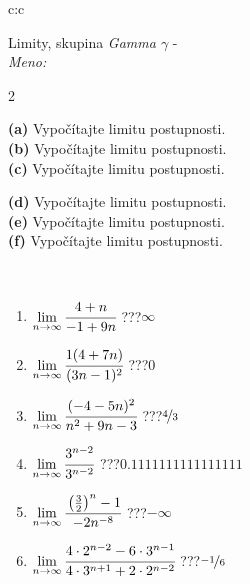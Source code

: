\documentclass[10pt]{report}
\begin{document}
\newpage
\thispagestyle{empty}
\begin{tabular}{c:c}
\begin{minipage}[c][104.5mm][t]{0.5\linewidth}
\begin{center}
\vspace{5mm}
{\huge Limity, skupina \textit{Gamma $\gamma$} -}\\[5mm]
\textit{Meno:}\phantom{xxxxxxxxxxxxxxxxxxxxxxxxxxxxxxxxxxxxxxxxxxxxxxxxxxxxxxxxxxxxxxxxx}\\[5mm]
\begin{minipage}{0.95\linewidth}
\begin{center}
{\small \begin{multicols}{2} \raggedright
\textbf{(a)} Vypočítajte limitu postupnosti. \\[1mm]
\textbf{(b)} Vypočítajte limitu postupnosti. \\[1mm]
\textbf{(c)} Vypočítajte limitu postupnosti. \par \columnbreak
\textbf{(d)} Vypočítajte limitu postupnosti. \\[1mm]
\textbf{(e)} Vypočítajte limitu postupnosti. \\[1mm]
\textbf{(f)} Vypočítajte limitu postupnosti.
\end{multicols}
}
\end{center}
\end{minipage}
\\[1mm]
\begin{minipage}{0.79\linewidth}
\begin{center}
\begin{varwidth}{\linewidth}
\setlength{\itemsep}{0pt}
\begin{enumerate}
\footnotesizerr
\item $\lim\limits_{n\to\infty}\cfrac{4+n}{-1+9n}$\quad \dotfill\; ???\;\dotfill \quad $\infty$
\item $\lim\limits_{n\to\infty}\cfrac{1(4+7n)}{(3n-1)^2}$\quad \dotfill\; ???\;\dotfill \quad $0$
\item $\lim\limits_{n\to\infty}\cfrac{(-4-5n)^2}{n^2+9n-3}$\quad \dotfill\; ???\;\dotfill \quad $\nicefrac{4}{3}$
\item $\lim\limits_{n\to\infty}\cfrac{3^{n-2}}{3^{n-2}}$\quad \dotfill\; ???\;\dotfill \quad $0.1111111111111111$
\item $\lim\limits_{n\to\infty}\cfrac{\left(\frac{3}{2}\right)^n -1}{-2n^{-8}}$\quad \dotfill\; ???\;\dotfill \quad $-\infty$
\item $\lim\limits_{n\to\infty}\cfrac{4\cdot 2^{n-2}-6\cdot 3^{n-1}}{4\cdot 3^{n+1}+2\cdot 2^{n-2}}$\quad \dotfill\; ???\;\dotfill \quad $\nicefrac{-1}{6}$

\end{enumerate}
\end{varwidth}
\end{center}
\end{minipage}
\end{center}
\end{minipage}
\end{tabular}
\end{document}

